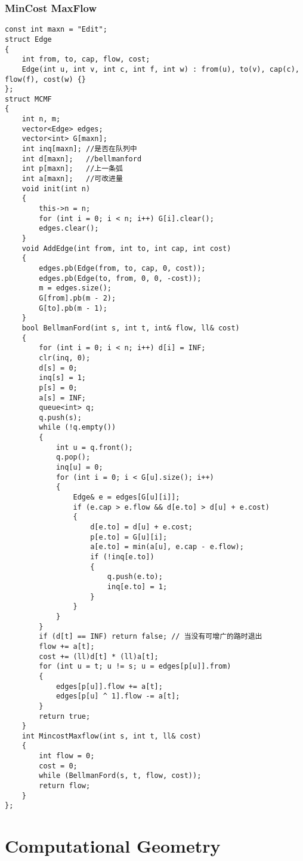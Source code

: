 \documentclass[twoside]{article}
\begin{document}
\subsubsection{MinCost MaxFlow}
\begin{lstlisting}
const int maxn = "Edit";
struct Edge
{
    int from, to, cap, flow, cost;
    Edge(int u, int v, int c, int f, int w) : from(u), to(v), cap(c), flow(f), cost(w) {}
};
struct MCMF
{
    int n, m;
    vector<Edge> edges;
    vector<int> G[maxn];
    int inq[maxn]; //是否在队列中
    int d[maxn];   //bellmanford
    int p[maxn];   //上一条弧
    int a[maxn];   //可改进量
    void init(int n)
    {
        this->n = n;
        for (int i = 0; i < n; i++) G[i].clear();
        edges.clear();
    }
    void AddEdge(int from, int to, int cap, int cost)
    {
        edges.pb(Edge(from, to, cap, 0, cost));
        edges.pb(Edge(to, from, 0, 0, -cost));
        m = edges.size();
        G[from].pb(m - 2);
        G[to].pb(m - 1);
    }
    bool BellmanFord(int s, int t, int& flow, ll& cost)
    {
        for (int i = 0; i < n; i++) d[i] = INF;
        clr(inq, 0);
        d[s] = 0;
        inq[s] = 1;
        p[s] = 0;
        a[s] = INF;
        queue<int> q;
        q.push(s);
        while (!q.empty())
        {
            int u = q.front();
            q.pop();
            inq[u] = 0;
            for (int i = 0; i < G[u].size(); i++)
            {
                Edge& e = edges[G[u][i]];
                if (e.cap > e.flow && d[e.to] > d[u] + e.cost)
                {
                    d[e.to] = d[u] + e.cost;
                    p[e.to] = G[u][i];
                    a[e.to] = min(a[u], e.cap - e.flow);
                    if (!inq[e.to])
                    {
                        q.push(e.to);
                        inq[e.to] = 1;
                    }
                }
            }
        }
        if (d[t] == INF) return false; // 当没有可增广的路时退出
        flow += a[t];
        cost += (ll)d[t] * (ll)a[t];
        for (int u = t; u != s; u = edges[p[u]].from)
        {
            edges[p[u]].flow += a[t];
            edges[p[u] ^ 1].flow -= a[t];
        }
        return true;
    }
    int MincostMaxflow(int s, int t, ll& cost)
    {
        int flow = 0;
        cost = 0;
        while (BellmanFord(s, t, flow, cost));
        return flow;
    }
};
\end{lstlisting}
\clearpage\section{Computational Geometry}
\end{document}
